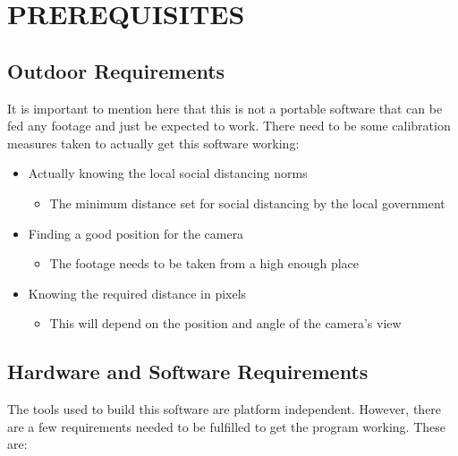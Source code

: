 \documentclass[a4paper]{article}
\begin{document}
\pagebreak

\section{PREREQUISITES}

\subsection{Outdoor Requirements}
It is important to mention here that this is not a portable software that can be fed any footage and just be expected to work. There need to be some
calibration measures taken to actually get this software working:

\begin{itemize}
    \item Actually knowing the local social distancing norms
          \begin{itemize}
              \item The minimum distance set for social distancing by the local government
          \end{itemize}

    \item Finding a good position for the camera
          \begin{itemize}
              \item The footage needs to be taken from a high enough place
          \end{itemize}

    \item Knowing the required distance in pixels
          \begin{itemize}
              \item This will depend on the position and angle of the camera's view
          \end{itemize}
\end{itemize}

\subsection{Hardware and Software Requirements}
The tools used to build this software are platform independent. However, there are a few requirements needed to be fulfilled to get the program
working. These are:
\end{document}
